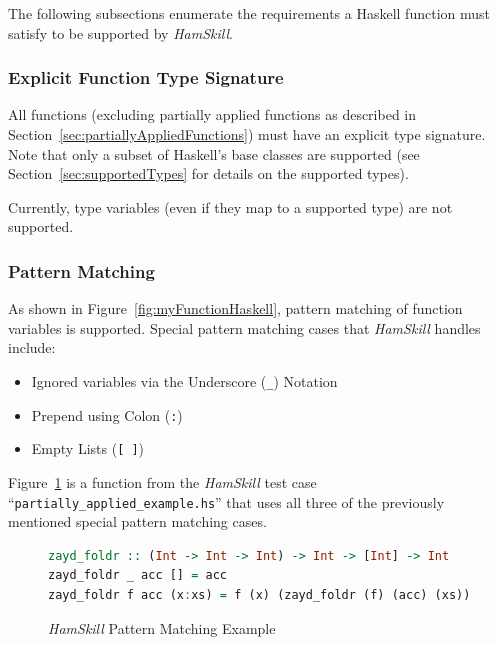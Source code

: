 \documentclass{report}
\begin{document}
The following subsections enumerate the requirements a Haskell function must satisfy to be supported by \textit{HamSkill}.

\subsubsection{Explicit Function Type Signature}\label{sec:explicitTypeSignature}

All functions (excluding partially applied functions as described in Section~\ref{sec:partiallyAppliedFunctions}) must have an explicit type signature.  Note that only a subset of Haskell's base classes are supported (see Section~\ref{sec:supportedTypes} for details on the supported types).  

Currently, type variables (even if they map to a supported type) are not supported.

\subsubsection{Pattern Matching}\label{sec:supportedPatternMatching}

As shown in Figure~\ref{fig:myFunctionHaskell}, pattern matching of function variables is supported.  Special pattern matching cases that \textit{HamSkill} handles include:

\begin{itemize}

\item Ignored variables via the Underscore (\texttt{\_}) Notation

\item Prepend using Colon (\texttt{:})

\item Empty Lists (\texttt{[ ]})

\end{itemize}

Figure~\ref{fig:functionZaydFoldr} is a function from the \textit{HamSkill} test case ``\texttt{partially\_applied\_example.hs}'' that uses all three of the previously mentioned special pattern matching cases.

\begin{figure}[H]
\begin{mdframed}
\begin{lstlisting}[basicstyle=\small, language=Haskell]
zayd_foldr :: (Int -> Int -> Int) -> Int -> [Int] -> Int
zayd_foldr _ acc [] = acc
zayd_foldr f acc (x:xs) = f (x) (zayd_foldr (f) (acc) (xs))
\end{lstlisting}
\end{mdframed}
\caption{\textit{HamSkill} Pattern Matching Example}\label{fig:functionZaydFoldr}
\end{figure}
\end{document}
